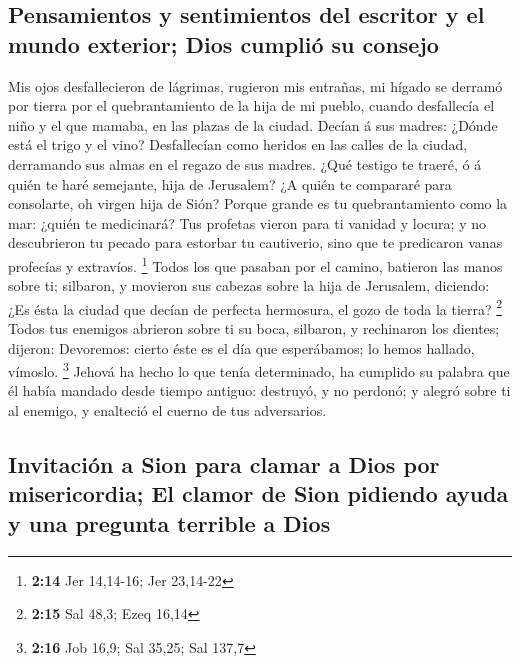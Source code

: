 \hypertarget{pensamientos-y-sentimientos-del-escritor-y-el-mundo-exterior-dios-cumpliuxf3-su-consejo}{%
\subsection{Pensamientos y sentimientos del escritor y el mundo
exterior; Dios cumplió su
consejo}\label{pensamientos-y-sentimientos-del-escritor-y-el-mundo-exterior-dios-cumpliuxf3-su-consejo}}

 Mis ojos desfallecieron de lágrimas, rugieron mis
entrañas, mi hígado se derramó por tierra por el quebrantamiento de la
hija de mi pueblo, cuando desfallecía el niño y el que mamaba, en las
plazas de la ciudad.  Decían á sus madres: ¿Dónde está el
trigo y el vino? Desfallecían como heridos en las calles de la ciudad,
derramando sus almas en el regazo de sus madres.  ¿Qué
testigo te traeré, ó á quién te haré semejante, hija de Jerusalem? ¿A
quién te compararé para consolarte, oh virgen hija de Sión? Porque
grande es tu quebrantamiento como la mar: ¿quién te medicinará?
 Tus profetas vieron para ti vanidad y locura; y no
descubrieron tu pecado para estorbar tu cautiverio, sino que te
predicaron vanas profecías y extravíos. \footnote{\textbf{2:14} Jer
  14,14-16; Jer 23,14-22}  Todos los que pasaban por el
camino, batieron las manos sobre ti; silbaron, y movieron sus cabezas
sobre la hija de Jerusalem, diciendo: ¿Es ésta la ciudad que decían de
perfecta hermosura, el gozo de toda la tierra? \footnote{\textbf{2:15}
  Sal 48,3; Ezeq 16,14}  Todos tus enemigos abrieron sobre
ti su boca, silbaron, y rechinaron los dientes; dijeron: Devoremos:
cierto éste es el día que esperábamos; lo hemos hallado, vímoslo.
\footnote{\textbf{2:16} Job 16,9; Sal 35,25; Sal 137,7} 
Jehová ha hecho lo que tenía determinado, ha cumplido su palabra que él
había mandado desde tiempo antiguo: destruyó, y no perdonó; y alegró
sobre ti al enemigo, y enalteció el cuerno de tus adversarios.

\hypertarget{invitaciuxf3n-a-sion-para-clamar-a-dios-por-misericordia-el-clamor-de-sion-pidiendo-ayuda-y-una-pregunta-terrible-a-dios}{%
\subsection{Invitación a Sion para clamar a Dios por misericordia; El
clamor de Sion pidiendo ayuda y una pregunta terrible a
Dios}\label{invitaciuxf3n-a-sion-para-clamar-a-dios-por-misericordia-el-clamor-de-sion-pidiendo-ayuda-y-una-pregunta-terrible-a-dios}}

